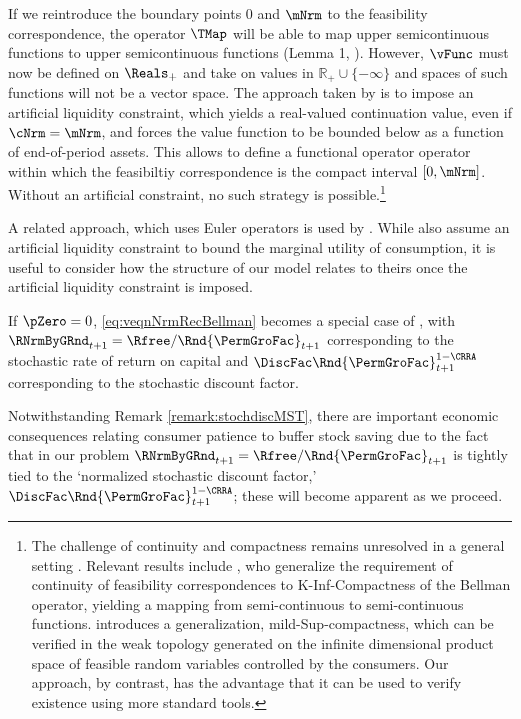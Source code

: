 \documentclass[\econtexRoot/BufferStockTheory]{subfiles}
\begin{document}
If we reintroduce the boundary points $0$ and $\mNrm$ to the feasibility correspondence, the operator $\TMap$ will be able to map upper semicontinuous functions to upper semicontinuous functions (Lemma 1, \cite{Jaskiewicz2011}).
However, $\vFunc$ must now be defined on $\Reals_{+}$ and take on values in $\mathbb{R}_{+}\cup\{-\infty\}$ and spaces of such functions will not be a vector space.
The approach taken by \cite{Ma2022} is to impose an artificial liquidity constraint, which yields a real-valued continuation value, even if $\cNrm= \mNrm$, and forces the value function to be bounded below as a function of end-of-period assets.
This allows \cite{Ma2022} to define a functional operator operator within which the feasibiltiy correspondence is the compact interval $[0, \mNrm]$.
Without an artificial constraint, no such strategy is possible.\footnote{The challenge of continuity and compactness remains unresolved in a general setting \citep{rinconZapatero2024}.
Relevant results include \cite{Feinberg2012}, who generalize the requirement of continuity of feasibility correspondences to K-Inf-Compactness of the Bellman operator, yielding a mapping from semi-continuous to semi-continuous functions.
\cite{Shanker2017a} introduces a generalization, mild-Sup-compactness, which can be verified in the weak topology generated on the infinite dimensional product space of feasible random variables controlled by the consumers.
Our approach, by contrast, has the advantage that it can be used to verify existence using more standard tools.} 


A related approach, which uses Euler operators is used by \cite{mstIncFluct}.
While \cite{mstIncFluct} also assume an artificial liquidity constraint to bound the marginal utility of consumption, it is useful to consider how the structure of our model relates to theirs  once the artificial liquidity constraint is imposed.


\begin{remark}\label{remark:stochdiscMST}
If $\pZero=0$, \eqref{eq:veqnNrmRecBellman} becomes a special case of \cite{mstIncFluct}, with $\RNrmByGRnd_{t+1}=\Rfree/\Rnd{\PermGroFac}_{t+1}$ corresponding to the stochastic rate of return on capital and $\DiscFac \Rnd{\PermGroFac}_{t+1}^{1-\CRRA}$  corresponding to the stochastic discount factor.
\end{remark}

Notwithstanding Remark \ref{remark:stochdiscMST},  there are important economic consequences relating consumer patience to buffer stock saving due to the fact that in our problem $\RNrmByGRnd_{t+1}=\Rfree/\Rnd{\PermGroFac}_{t+1}$ is tightly tied to the `normalized stochastic discount factor,' $\DiscFac \Rnd{\PermGroFac}_{t+1}^{1-\CRRA}$; these will become apparent as we proceed.
\end{document}

